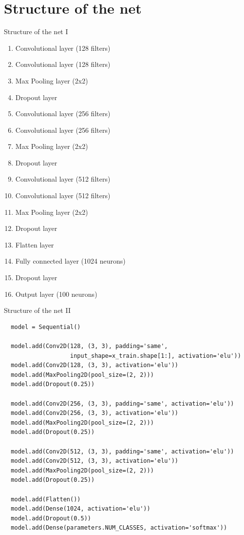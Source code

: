 \documentclass{beamer}
\begin{document}
\section{Structure of the net}

\begin{frame}[fragile]{Structure of the net I}
 \begin{multicols}{2}

  \begin{enumerate}
   \item<+-> Convolutional layer (128 filters)
   \item<+-> Convolutional layer (128 filters)
   \item<+-> Max Pooling layer (2x2)
   \item<+-> Dropout layer
   \item<+-> Convolutional layer (256 filters)
   \item<+-> Convolutional layer (256 filters)
   \item<+-> Max Pooling layer (2x2)
   \item<+-> Dropout layer
   \item<+-> Convolutional layer (512 filters)
   \item<+-> Convolutional layer (512 filters)
   \item<+-> Max Pooling layer (2x2)
   \item<+-> Dropout layer
   \item<+-> Flatten layer
   \item<+-> Fully connected layer (1024 neurons)
   \item<+-> Dropout layer
   \item<+-> Output layer (100 neurons)
  \end{enumerate}
 \end{multicols}


\end{frame}

\begin{frame}[fragile]{Structure of the net II}
 \begin{verbatim}
  model = Sequential()

  model.add(Conv2D(128, (3, 3), padding='same',
                   input_shape=x_train.shape[1:], activation='elu'))
  model.add(Conv2D(128, (3, 3), activation='elu'))
  model.add(MaxPooling2D(pool_size=(2, 2)))
  model.add(Dropout(0.25))

  model.add(Conv2D(256, (3, 3), padding='same', activation='elu'))
  model.add(Conv2D(256, (3, 3), activation='elu'))
  model.add(MaxPooling2D(pool_size=(2, 2)))
  model.add(Dropout(0.25))

  model.add(Conv2D(512, (3, 3), padding='same', activation='elu'))
  model.add(Conv2D(512, (3, 3), activation='elu'))
  model.add(MaxPooling2D(pool_size=(2, 2)))
  model.add(Dropout(0.25))

  model.add(Flatten())
  model.add(Dense(1024, activation='elu'))
  model.add(Dropout(0.5))
  model.add(Dense(parameters.NUM_CLASSES, activation='softmax'))

  \end{verbatim}
\end{frame}
\end{document}
